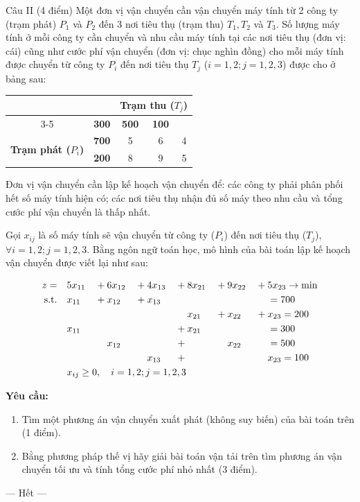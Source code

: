 \vspace{0.8cm}
\begin{questionblock}{Câu II (4 điểm)}
Một đơn vị vận chuyển cần vận chuyển máy tính từ 2 công ty (trạm phát) $P_1$ và $P_2$ đến 3 nơi tiêu thụ (trạm thu) $T_1, T_2$ và $T_3$. Số lượng máy tính ở mỗi công ty cần chuyển và nhu cầu máy tính tại các nơi tiêu thụ (đơn vị: cái) cũng như cước phí vận chuyển (đơn vị: chục nghìn đồng) cho mỗi máy tính được chuyển từ công ty $P_i$ đến nơi tiêu thụ $T_j$ ($i = 1,2; j = 1,2,3$) được cho ở bảng sau:

\begin{table}[htbp]
    \centering
    \renewcommand{\arraystretch}{1.3}
    \begin{tabular}{|c|c|c|c|c|}
        \hline
        \multicolumn{2}{|c|}{\multirow{2}{*}{}} & \multicolumn{3}{c|}{\textbf{Trạm thu ($T_j$)}} \\
        \cline{3-5}
        \multicolumn{2}{|c|}{} & \textbf{300} & \textbf{500} & \textbf{100} \\
        \hline
        \multirow{2}{*}{\textbf{Trạm phát ($P_i$)}} & \textbf{700} & 5 & 6 & 4 \\
        \cline{2-5}
        & \textbf{200} & 8 & 9 & 5 \\
        \hline
    \end{tabular}
\end{table}

Đơn vị vận chuyển cần lập kế hoạch vận chuyển để: các công ty phải phân phối hết số máy tính hiện có; các nơi tiêu thụ nhận đủ số máy theo nhu cầu và tổng cước phí vận chuyển là thấp nhất.

Gọi $x_{ij}$ là số máy tính sẽ vận chuyển từ công ty ($P_i$) đến nơi tiêu thụ ($T_j$), $\forall i=1,2; j=1,2,3$. Bằng ngôn ngữ toán học, mô hình của bài toán lập kế hoạch vận chuyển được viết lại như sau:

\begin{alignat*}{6}
    z = \quad & 5x_{11} & {}+{} & 6x_{12} & {}+{} & 4x_{13} & {}+{} & 8x_{21} & {}+{} & 9x_{22} & {}+{} & 5x_{23} \rightarrow \min \\
    \text{s.t.} \quad & x_{11} & {}+{} & x_{12} & {}+{} & x_{13} & & & & & & = 700 \\
    & & & & & & & x_{21} & {}+{} & x_{22} & {}+{} & x_{23} = 200 \\
    & x_{11} & & & & & {}+{} & x_{21} & & & & = 300 \\
    & & & x_{12} & & & {}+{} & & & x_{22} & & = 500 \\
    & & & & & x_{13} & {}+{} & & & & & x_{23} = 100 \\
    & \rlap{$x_{ij} \ge 0, \quad i=1,2; j=1,2,3$}
\end{alignat*}

\textbf{Yêu cầu:}
\begin{enumerate}
    \item Tìm một phương án vận chuyển xuất phát (không suy biến) của bài toán trên (1 điểm).
    \item Bằng phương pháp thế vị hãy giải bài toán vận tải trên tìm phương án vận chuyển tối ưu và tính tổng cước phí nhỏ nhất (3 điểm).
\end{enumerate}
\end{questionblock}

\vspace{0.5cm}
\begin{center}
    --- Hết ---
\end{center}
